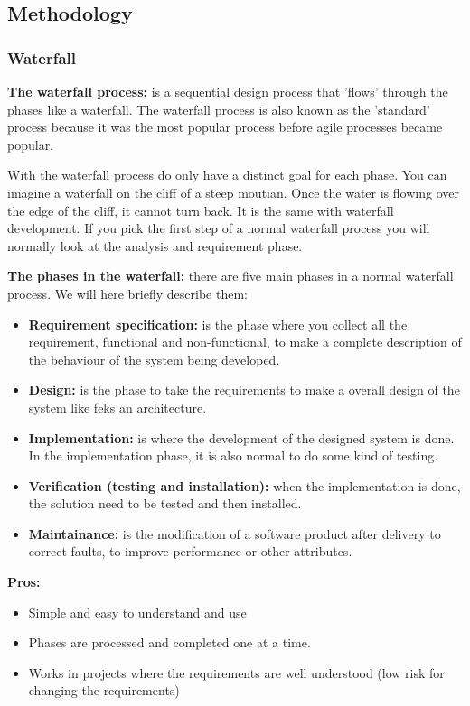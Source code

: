\subsection{Methodology}

\subsubsection{Waterfall}

{\bf The waterfall process: } is a sequential design process that 'flows' through the phases like a waterfall.
The waterfall process is also known as the 'standard' process because it was the most popular process before
agile processes became popular. 

With the waterfall process do only have a distinct goal for each phase. You can imagine a waterfall on the cliff of a steep moutian. Once the water is flowing over the edge of the cliff, it cannot turn back. It is the same with waterfall development. If you pick the first step of a normal waterfall process you will normally look at the analysis and requirement phase.

{\bf The phases in the waterfall:} there are five main phases in a normal waterfall process. We will here briefly
describe them:
\begin{itemize}
	\item {\bf Requirement specification:} is the phase where you collect all the requirement, functional and non-functional, to make a complete description of the behaviour of the system being developed.
	\item {\bf Design: } is the phase to take the requirements to make a overall design of the system like feks an
	architecture.
	\item {\bf Implementation: } is where the development of the designed system is done. In the implementation phase, 
	it is also normal to do some kind of testing.
	\item {\bf Verification (testing and installation): } when the implementation is done, the solution need to be tested and then installed.
	\item {\bf Maintainance: } is the modification of a software product after delivery to correct faults, to improve performance or other attributes.
\end{itemize}

{\bf Pros: }
\begin{itemize}
	\item Simple and easy to understand and use
	\item Phases are processed and completed one at a time.
	\item Works in projects where the requirements are well understood (low risk for changing the requirements)
\end{itemize}

